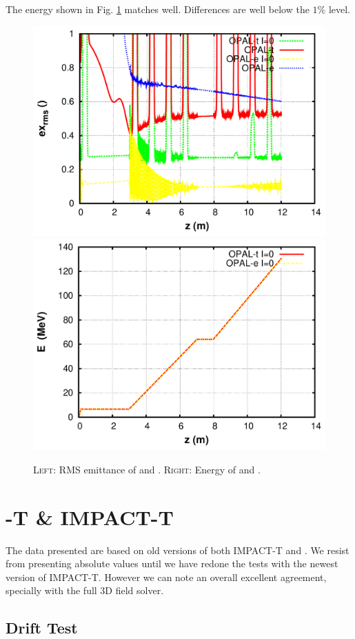 \documentclass{psi-note}    %
\begin{document}
{The energy shown in Fig. \ref{fig:tt_et_energy} matches well. Differences are
well below the $1\%$ level.
\begin{figure}[htbp]
\begin{center}
\includegraphics[width=.4\linewidth]{figures/et-tt-exrms}
\includegraphics[width=.4\linewidth]{figures/et-tt-energy}
\caption{\textsc{Left}: RMS emittance of \opalt and \opale. \textsc{Right}: Energy of \opalt and \opale.}
\label{fig:tt_et_energy}
\end{center}
\end{figure}

\section{\opal-T \& IMPACT-T} \label{sec:OPALImpactt}

The data presented are based on old versions of both IMPACT-T and \opalt. We
resist from presenting absolute values until we have redone the tests with
the newest version of IMPACT-T. However we can note an overall excellent
agreement, specially with the full 3D field solver. 

\subsection{Drift Test} \label{sec:Drift}

}
\end{document}
